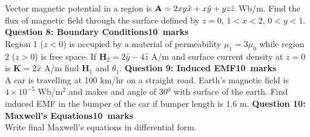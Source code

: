\documentclass[12pt,a4paper]{article}
\def\Qeight{10}
\def\Qnine{10}
\def\Qten{10}
\begin{document}
Vector magnetic potential in a region is $\mathrm{\textbf A}=2xy\hat x+x\hat y+yz\hat z$ Wb/m. Find the flux of magnetic field through the surface defined by $z=0$, $1<x<2$, $0<y<1$.
\newpage
\noindent\textbf{Question 8: Boundary Conditions\hfill \Qeight~marks}\\
Region 1 ($z<0$) is occupied by a material of permeability $\mu_1=3\mu_0$ while region 2 ($z>0$) is free space. If $\textbf{H}_2=2\hat y-4\hat z$ A/m and surface current density at $z=0$ is $\textbf{K}=2\hat x$ A/m find \textbf{H}$_1$ and $\theta_1$.
\newpage
\noindent\textbf{Question 9: Induced EMF\hfill \Qnine~marks}\\
A car is travelling at 100 km/hr on a straight road. Earth's magnetic field is $4\times10^{-5}$ Wb/m$^2$ and makes and angle of 30$^0$ with surface of the earth. Find induced EMF in the bumper of the car if bumper length is 1.6 m.
\newpage
\noindent\textbf{Question 10: Maxwell's Equations\hfill \Qten~marks}\\
Write final Maxwell's equations in differential form.
\end{document}
